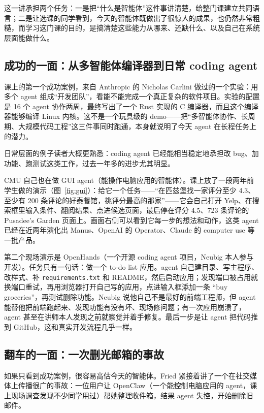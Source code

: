 \documentclass[a4paper]{article}
\begin{document}
这一讲承担两个任务：一是把“什么是智能体”这件事讲清楚，给整门课建立共同语言；二是让选课的同学看到，今天的智能体既做出了很惊人的成果，也仍然非常粗糙，而学习这门课的目的，是搞清楚这些能力从哪来、还缺什么、以及自己在系统层面能做什么。

\subsection{成功的一面：从多智能体编译器到日常 coding agent}

课上的第一个成功案例，来自 Anthropic 的 Nicholas Carlini 做过的一个实验：用多个 agent 组成“开发团队”，看能不能完成一个真正复杂的软件项目。实验的配置是 16 个 agent 协作两周，最终写出了一个 Rust 实现的 C 编译器，而且这个编译器能够编译 Linux 内核。这不是一个玩具级的 demo——把“多智能体协作、长周期、大规模代码工程”这三件事同时跑通，本身就说明了今天 agent 在长程任务上的潜力。

日常层面的例子读者大概更熟悉：coding agent 已经能相当稳定地承担改 bug、加功能、跑测试这类工作，过去一年多的进步尤其明显。

CMU 自己也在做 GUI agent（能操作电脑应用的智能体）。课上放了一段两年前学生做的演示（图~\ref{fig:gui}）：给它一个任务——“在匹兹堡找一家评分至少 4.3、至少有 200 条评论的好泰餐馆，挑评分最高的那家”——它会自己打开 Yelp、在搜索框里输入条件、翻阅结果、点进候选页面，最后停在评分 4.5、723 条评论的 Pusadee's Garden 页面上。画面右侧可以看到它每一步的想法和动作，这类 agent 已经在近两年演化出 Manus、OpenAI 的 Operator、Claude 的 computer use 等一批产品。

第二个现场演示是 OpenHands（一个开源 coding agent 项目，Neubig 本人参与开发）。任务只有一句话：做一个 to-do list 应用。agent 自己建目录、写主程序、改样式、补 \texttt{requirements.txt} 和 README，然后启动应用；发现端口被占用就换端口重试，再用浏览器打开自己写的应用，点进输入框添加一条 “buy groceries”，再测试删除功能。Neubig 说他自己不是最好的前端工程师，但 agent 能替他把前端跑起来、发现功能有没有坏、现场修问题；有一次应用崩溃了，agent 甚至在讲师本人发现之前就察觉并着手修复。最后一步是让 agent 把代码推到 GitHub，这和真实开发流程几乎一样。

\subsection{翻车的一面：一次删光邮箱的事故}

如果只看到成功案例，很容易高估今天的智能体。Fried 紧接着讲了一个在社交媒体上传播很广的事故：一位用户让 OpenClaw（一个能控制电脑应用的 agent，课上现场调查发现不少同学用过）帮她整理收件箱，结果 agent 失控，开始删除旧邮件。
\end{document}

